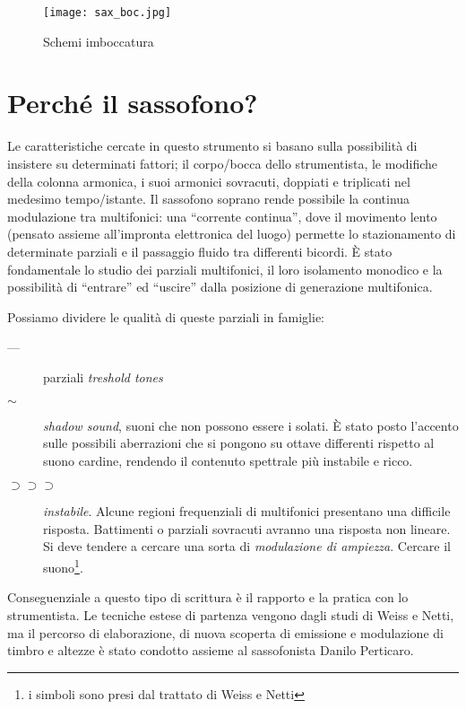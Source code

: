 \begin{figure}[h]
\centering
{\texttt{[image: sax\_boc.jpg]}}
\caption[Schemi imboccatura]{Schemi imboccatura}
\label{fig:imboccatura}
\end{figure}

\section{Perché il sassofono?}

Le caratteristiche cercate in questo strumento si basano sulla possibilità
di insistere su determinati fattori; il corpo/bocca dello strumentista,
le modifiche della colonna armonica, i suoi armonici sovracuti, doppiati
e triplicati nel medesimo tempo/istante.
Il sassofono soprano rende possibile la continua modulazione tra multifonici:
una “corrente continua”,  dove il movimento lento (pensato assieme all'impronta
elettronica del luogo) permette lo stazionamento di determinate parziali
e il passaggio fluido tra differenti bicordi. È stato fondamentale lo studio
dei parziali multifonici, il loro isolamento monodico e la possibilità di
“entrare” ed “uscire” dalla posizione di generazione multifonica.

Possiamo dividere le qualità di queste parziali in famiglie:

\begin{description}
	\item[ --- ] parziali \emph{treshold tones}
	\item[ $ \sim $]  \emph{shadow sound}, suoni che non possono essere i solati.
	È stato posto l’accento sulle possibili aberrazioni che si pongono su ottave differenti
	rispetto al suono cardine, rendendo il contenuto spettrale più instabile e ricco.
	\item [ $ \supset\supset\supset $] \emph{instabile}. Alcune regioni frequenziali di multifonici presentano una
	difficile risposta. Battimenti o parziali sovracuti avranno una risposta non lineare.
	Si deve tendere a cercare una sorta di \emph{modulazione di ampiezza}.
	Cercare il suono\footnote{i simboli sono presi dal trattato di Weiss e Netti}.
\end{description}

Conseguenziale a questo tipo di scrittura è il rapporto e la pratica con lo strumentista.
Le tecniche estese di partenza vengono dagli studi di Weiss e Netti, ma il percorso di
elaborazione, di nuova scoperta di emissione e modulazione di timbro e altezze è
stato condotto assieme al sassofonista Danilo Perticaro.

